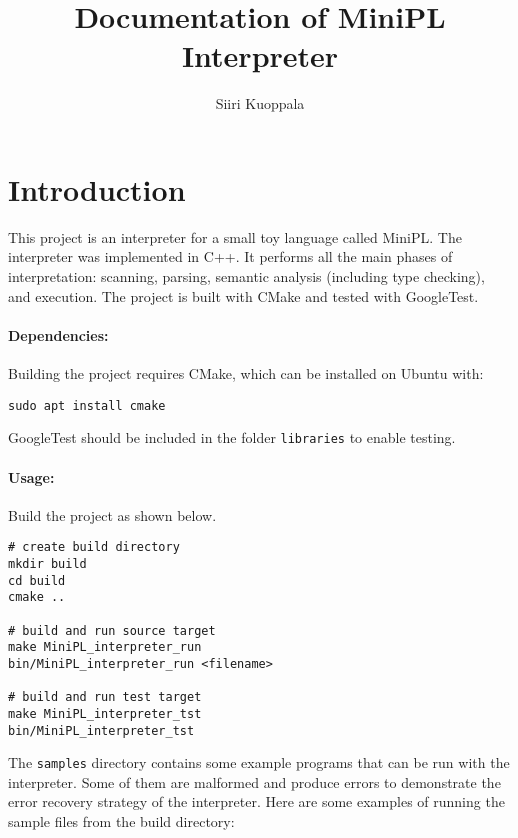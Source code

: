 \documentclass[a4paper]{article}
\newcommand*{\code}[1]{\texttt{#1}}
\begin{document}
\begin{titlepage}
  \title{Documentation of MiniPL Interpreter}
  \author{Siiri Kuoppala}
  \maketitle
  \tableofcontents
\end{titlepage}


\section{Introduction}
This project is an interpreter for a small toy language
called MiniPL. 
The interpreter was implemented in C++.
It performs all the main phases of interpretation: 
scanning, parsing, semantic analysis (including type checking), 
and execution. The project is built with CMake and tested 
with GoogleTest. 

\paragraph*{Dependencies:} Building the project requires CMake, 
which can be installed on Ubuntu with: 
\begin{verbatim}
sudo apt install cmake
\end{verbatim}

GoogleTest should be included in 
the folder \code{libraries} to enable testing.

\paragraph*{Usage:} Build the project as shown below.

\begin{verbatim}
# create build directory
mkdir build
cd build
cmake ..

# build and run source target
make MiniPL_interpreter_run
bin/MiniPL_interpreter_run <filename>

# build and run test target
make MiniPL_interpreter_tst
bin/MiniPL_interpreter_tst
\end{verbatim}

The \code{samples} directory contains some example programs 
that can be run with the interpreter. Some of them are malformed 
and produce errors to demonstrate the error recovery strategy 
of the interpreter. Here are some examples of running the sample 
files from the build directory: 
\end{document}
